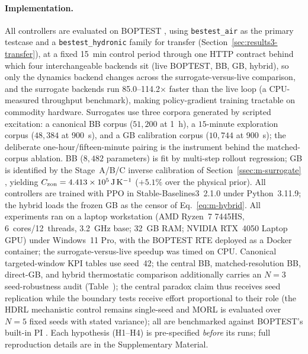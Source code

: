 \paragraph{Implementation.}\label{sec:setup}\label{ssec:s-testbed}\label{ssec:s-data}\label{ssec:s-train}
All controllers are evaluated on BOPTEST \citep{Blum2021BOPTEST,Wetter2014Modelica,Arroyo2021GymBOPTEST}, using \texttt{bestest\_air} as the primary testcase and a \texttt{bestest\_hydronic} family for transfer (Section~\ref{sec:results3-transfer}), at a fixed \SI{15}{\minute} control period through one HTTP contract behind which four interchangeable backends sit (live BOPTEST, BB, GB, hybrid), so only the dynamics backend changes across the surrogate-versus-live comparison, and the surrogate backends run \numrange{85.0}{114.2}$\times$ faster than the live loop (a CPU-measured throughput benchmark), making policy-gradient training tractable on commodity hardware. Surrogates use three corpora generated by scripted excitation: a canonical BB corpus ($51{,}200$ at \SI{1}{\hour}), a $15$-minute exploration corpus ($48{,}384$ at \SI{900}{\second}), and a GB calibration corpus ($10{,}744$ at \SI{900}{\second}); the deliberate one-hour/fifteen-minute pairing is the instrument behind the matched-corpus ablation. BB ($8{,}482$ parameters) is fit by multi-step rollout regression; GB is identified by the Stage~A/B/C inverse calibration of Section~\ref{ssec:m-surrogate} \citep{Bacher2011RCIdentification}, yielding $C_{\mathrm{zon}}=\SI{4.413e5}{\joule\per\kelvin}$ ($+5.1\%$ over the physical prior). All controllers are trained with PPO \citep{Schulman2017PPO} in Stable-Baselines3~2.1.0 \citep{Raffin2021SB3} under Python~3.11.9; the hybrid loads the frozen GB as the censor of Eq.~\eqref{eq:m-hybrid}. All experiments ran on a laptop workstation (AMD Ryzen~7 7445HS, 6~cores/12~threads, 3.2~GHz base; 32~GB RAM; NVIDIA RTX~4050 Laptop GPU) under Windows~11 Pro, with the BOPTEST RTE deployed as a Docker container; the surrogate-versus-live speedup was timed on CPU. Canonical targeted-window KPI tables use seed~42; the central BB, matched-resolution BB, direct-GB, and hybrid thermostatic comparison additionally carries an $N=3$ seed-robustness audit (Table~); the central paradox claim thus receives seed replication while the boundary tests receive effort proportional to their role (the HDRL mechanistic control remains single-seed and MORL is evaluated over $N=5$ fixed seeds with stated variance); all are benchmarked against BOPTEST's built-in PI \citep{Wang2025SafeDRL}. Each hypothesis (H1--H4) is pre-specified \emph{before} its runs; full reproduction details are in the Supplementary Material.

